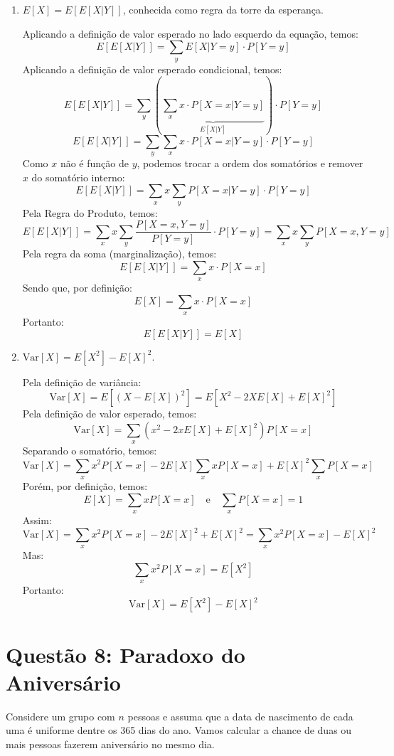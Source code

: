 \documentclass[12 pt]{article}
\begin{document}
\begin{enumerate}
    \item $E[X] = E[E[X|Y]]$, conhecida como regra da torre da esperança.
    \begin{tcolorbox}[colframe=black, title=Resposta:]
        Aplicando a definição de valor esperado no lado esquerdo da equação, temos:
            $$E[E[X|Y]] = \sum_y E[X|Y=y] \cdot P[Y=y] $$ 
        Aplicando a definição de valor esperado condicional, temos:
            $$E[E[X|Y]] = \sum_y \left( \underbrace{\sum_x x \cdot P[X=x|Y=y]}_{E[X|Y]} \right)\cdot P[Y=y]$$
            $$E[E[X|Y]] = \sum_y \sum_x x \cdot P[X=x|Y=y] \cdot P[Y=y]$$
        Como $x$ não é função de $y$, podemos trocar a ordem dos somatórios e remover $x$ do somatório interno:
            $$E[E[X|Y]] = \sum_x x \sum_y P[X=x|Y=y] \cdot P[Y=y]$$
        Pela Regra do Produto, temos:
            $$E[E[X|Y]] = \sum_x x \sum_y \frac{P[X=x , Y=y]}{P[Y=y]} \cdot P[Y=y] = \sum_x x \sum_y P[X=x , Y=y]$$
        Pela regra da soma (marginalização), temos:
            $$E[E[X|Y]] = \sum_x x \cdot P[X=x]$$
        Sendo que, por definição:
            $$E[X] = \sum_x x \cdot P[X=x]$$
        Portanto:
            $$\boxed{E[E[X|Y]] = E[X]}$$

    \end{tcolorbox}
    \newpage
    \item $\text{Var}[X] = E[X^2] - E[X]^2$.
    \begin{tcolorbox}[colframe=black, title=Resposta:]
        Pela definição de variância:
        $$\text{Var}[X] = E[(X - E[X])^2] = E[X^2 - 2X E[X] + E[X]^2]$$
        Pela definição de valor esperado, temos:
        $$\text{Var}[X] = \sum_x (x^2 - 2x E[X] + E[X]^2) P[X=x]$$
        Separando o somatório, temos:
        $$\text{Var}[X] = \sum_x x^2 P[X=x] - 2 E[X] \sum_x x P[X=x] + E[X]^2 \sum_x P[X=x]$$
        Porém, por definição, temos:
        $$E[X] = \sum_x x P[X=x] \quad \text{e} \quad \sum_x P[X=x] = 1$$
        Assim:
        $$\text{Var}[X] = \sum_x x^2 P[X=x] - 2 E[X]^2 + E[X]^2 = \sum_x x^2 P[X=x] - E[X]^2$$
        Mas:
        $$\sum_x x^2 P[X=x] = E[X^2] $$
        Portanto:
        $$\boxed{\text{Var}[X] = E[X^2] - E[X]^2}$$
    \end{tcolorbox}
\end{enumerate}

\newpage
\section*{Questão 8: Paradoxo do Aniversário}
Considere um grupo com $n$ pessoas e assuma que a data de nascimento de cada uma é uniforme dentre
os 365 dias do ano. Vamos calcular a chance de duas ou mais pessoas fazerem aniversário no mesmo dia.
\end{document}
